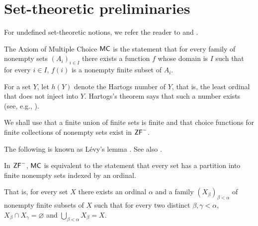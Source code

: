 \section{Set-theoretic preliminaries}\label{sec:preliminaries}

For undefined set-theoretic notions, we refer the reader to \cite{Kunen2009} and \cite{Kunen2011}.

The Axiom of Multiple Choice $\mathsf{MC}$ is the statement that
for every family of nonempty sets $(A_i)_{i\in I}$ there exists
a function $f$ whose domain is $I$ such that for every $i\in I$,
$f(i)$ is a nonempty finite subset of $A_i$.

For a set $Y$, let $h(Y)$ denote the Hartogs number
of $Y$, that is, the least
ordinal that does not inject into $Y$. Hartogs's theorem says that such a
number exists (see, e.g., \cite[\S I.11]{Kunen2009}).

We shall use that a finite union of finite sets is finite and that
choice functions for finite collections of nonempty sets exist in $\mathsf{ZF}^{-}$.

The following is known as L\'evy's lemma \cite{Levy1962}.
See also
\cite[Lemma~1, p.~105]{Tachtsis2019}.

\begin{lemma}[L\'evy]\label{lem:partition}
In $\mathsf{ZF}^{-}$, $\mathsf{MC}$ is equivalent to the statement that
every set has a partition into finite nonempty sets
indexed by an ordinal.

That is, for every set $X$ there exists an ordinal $\alpha$ and a family $(X_\beta)_{\beta<\alpha}$ of nonempty finite subsets of $X$ such that for every two distinct $\beta,\gamma<\alpha$, $X_\beta\cap X_\gamma=\varnothing$ and $\bigcup_{\beta<\alpha}X_\beta=X$.
\end{lemma}


